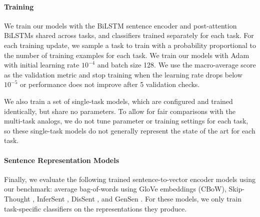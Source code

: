 \documentclass{article} \usepackage{iclr2019_conference,times}
\begin{document}
\paragraph{Training}

We train our models with the BiLSTM sentence encoder and post-attention BiLSTMs shared across tasks, and classifiers trained separately for each task.
For each training update, we sample a task to train with a probability proportional to the number of training examples for each task.
We train our models with Adam \citep{kingma2014adam} with initial learning rate $10^{-4}$ and batch size 128.
We use the macro-average score as the validation metric and stop training when the learning rate drops below $10^{-5}$ or performance does not improve after 5 validation checks.

We also train a set of single-task models, which are configured and trained identically, but share no parameters. To allow for fair comparisons with the multi-task analogs, we do not tune parameter or training settings for each task, so these single-task models do not generally represent the state of the art for each task.
 
\paragraph{Sentence Representation Models}

Finally, we evaluate the following trained sentence-to-vector encoder models using our benchmark: average bag-of-words using GloVe embeddings (CBoW), Skip-Thought \citep{kiros2015skip}, InferSent \citep{DBLP:conf/emnlp/ConneauKSBB17}, DisSent \citep{nie2017dissent}, and GenSen \citep{subramanian2018large}. 
For these models, we only train task-specific classifiers on the representations they produce. 
\end{document}
